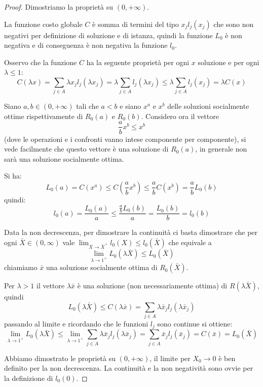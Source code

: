 \documentclass[a4paper]{article}
\theoremstyle{plain}
\theoremstyle{definition}
\theoremstyle{remark}
\newcommand{\pa}[1]{\left(#1\right)}
\begin{document}
\begin{proof}
  Dimostriamo la proprietà su $\pa{0,+\infty}$.

  La funzione costo globale $C$ è somma di termini del tipo $x_j
  l_j(x_j)$ che sono non negativi per definizione di soluzione e di
  istanza, quindi la funzione $L_0$ è non negativa e di conseguenza è
  non negativa la funzione $l_0$.

  Osservo che la funzione $C$ ha la seguente proprietà per ogni $x$
  soluzione e per ogni $\lambda \le 1$:
  \[ C\pa{\lambda x} = \sum _{j\in A} \lambda x_j l_j\pa{\lambda x_j}
    = \lambda \sum _{j\in A} l_j\pa{\lambda x_j} \le \lambda \sum
    _{j\in A} l_j\pa{ x_j} = \lambda C\pa{x} \]

  Siano $a,b\in \pa{0,+\infty}$ tali che $a<b$ e siano $x^a$ e $x^b$
  delle soluzioni socialmente ottime rispettivamente di $R_0\pa{a}$ e
  $R_0\pa{b}$. Considero ora il vettore
  \[ \frac{a}{b} x^b \le x^b \]
  (dove le operazioni e i confronti vanno intese componente per
  componente), si vede facilmente che questo vettore è una soluzione
  di $R_0(a)$, in generale non sarà una soluzione socialmente ottima.

  Si ha:
  \[ L_0\pa{a} = C\pa{x^a} \le C\pa{\frac{a}{b} x^b} \le \frac{a}{b}
    C\pa{x^b} = \frac{a}{b}L_0\pa{b} \]
  quindi:
  \[ l_0(a) = \frac{L_0(a)}{a} \le \frac{\frac{a}{b} L_0(b)}{a}
    =\frac{L_0(b)}{b} = l_0(b) \]
  
  Data la non decrescenza, per dimostrare la continuità ci basta
  dimostrare che per ogni $\bar X\in \pa{0,\infty}$ vale
  $\lim _{X\to \bar X^+} l_0\pa{X} \le l_0\pa{\bar X}$ che equivale a
  \[ \lim _{\lambda \to 1^+} L_0\pa{\lambda \bar X} \le
    L_0\pa{\bar X} \] chiamiamo $\bar x$ una soluzione socialmente
  ottima di $R_0\pa{\bar X}$.
  
  Per $\lambda > 1$ il vettore $\lambda \bar x$ è una soluzione (non
  necessariamente ottima) di $R\pa{\lambda \bar X}$, quindi
  \[ L_0\pa{\lambda \bar X} \le C\pa{\lambda \bar x} = \sum _{j\in A}
    \lambda \bar x_j l_j(\lambda \bar x_j) \]
  passando al limite e ricordando che le funzioni $l_j$ sono continue
  si ottiene:
  \[ \lim _{\lambda \to 1^+} L_0\pa{\lambda \bar X} \le \lim _{\lambda
      \to 1^+} \sum _{j\in A}\lambda \bar x_j l_j\pa{\lambda \bar x_j}
    = \sum _{j\in A} \bar x_j l_j\pa{\bar x_j} = C\pa{\bar x} =
    L_0\pa{\bar X} \]

  Abbiamo dimostrato le proprietà su $\pa{0,+\infty}$, il limite per
  $X_0 \to 0$ è ben definito per la non decrescenza. La continuità e
  la non negatività sono ovvie per la definizione di $l_0\pa{0}$.
\end{proof}
\end{document}
